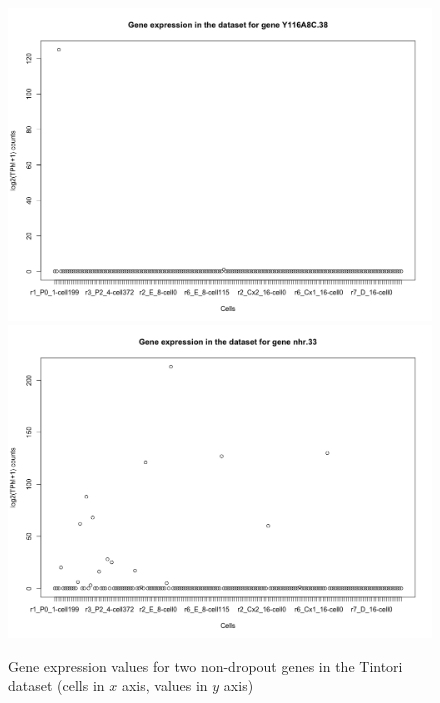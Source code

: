 \documentclass{report}
\begin{document}
{\begin{figure}[H]
\centering
\subfigure\includegraphics[scale=0.35]{plotsCopula/tintori/depCellGene_m=5_tintori_nodropout.png}
\subfigure\includegraphics[scale=0.35]{plotsCopula/tintori/depCellGene_m=5_tintori_nodropout3.png}
\caption{Gene expression values for two non-dropout genes in the Tintori dataset (cells in $x$ axis, values in $y$ axis)}
\label{geneexpression1}
\end{figure}

}
\end{document}
